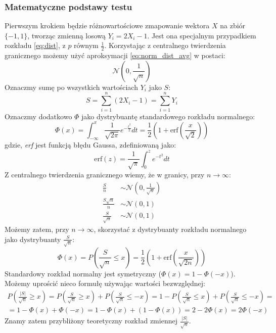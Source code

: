 \subsubsection{Matematyczne podstawy testu}
Pierwszym krokiem będzie różnowartościowe zmapowanie wektora $X$ na zbiór $\{-1, 1\}$, tworząc zmienną losową $Y_i = 2X_i - 1$. Jest ona specjalnym przypadkiem rozkładu \ref{eq:dist}, z $p$ równym $\frac{1}{2}$. Korzystając z centralnego twierdzenia granicznego możemy użyć aproksymacji \ref{eq:norm_dist_avg} w postaci:
\begin{equation}
    \mathcal{N}\left(0, \frac{1}{\sqrt{n}}\right)
\end{equation}
Oznaczmy sumę po wszystkich wartościach $Y_i$ jako $S$:
\begin{equation}
    S =\sum_{i=1}^{n}(2X_i-1) = \sum_{i=1}^{n}Y_i
\end{equation}
Oznaczmy dodatkowo $\Phi$ jako dystrybuantę standardowego rozkładu normalnego:
\begin{equation}
    \Phi(x) = \int_{-\infty}^x\frac{1}{\sqrt{2\pi}}e^{-\frac{t^2}{2}} dt = \frac{1}{2}\left(1+ \textrm{erf}\left(\frac{x}{\sqrt{2}}\right)\right)
\end{equation}
gdzie, \emph{erf} jest funkcją błędu Gaussa, zdefiniowaną jako:
\begin{equation}
    \textrm{erf}(z) = \frac{1}{\sqrt{\pi}}\int_{0}^ze^{-t^2} dt
\end{equation}
Z centralnego twierdzenia granicznego wiemy, że w granicy, przy $n \to \infty$:
\begin{equation}
\begin{split}
    \label{eq:bin_norm}
    \frac{S}{n} &\sim \mathcal{N}\left(0, \frac{1}{\sqrt{n}}\right)\\
    \frac{S\sqrt{n}}{n} &\sim \mathcal{N}\left(0, 1\right)\\
    \frac{S}{\sqrt{n}} &\sim \mathcal{N}\left(0, 1\right)
\end{split}
\end{equation}
Możemy zatem, przy $n \to \infty$, skorzystać z dystrybuanty rozkładu normalnego jako dystrybuanty $\frac{S}{\sqrt{n}}$:
\begin{equation}
    \Phi(x) = P(\frac{S}{\sqrt{n}} \leq x) = \frac{1}{2}\left(1+ \textrm{erf}\left(\frac{x}{\sqrt{2n}}\right)\right)
\end{equation}
Standardowy rozkład normalny jest symetryczny ($\Phi(x) = 1-\Phi(-x)$). Możemy uprościć nieco formułę używając wartości bezwzględnej: 
\begin{equation}
\begin{gathered}
    P\left(\frac{|S|}{\sqrt{n}} \geq x\right) = P\left(\frac{S}{\sqrt{n}} \geq x\right) + P\left(\frac{S}{\sqrt{n}} \leq -x\right) =
    1 - P\left(\frac{S}{\sqrt{n}} \leq x\right) + P\left(\frac{S}{\sqrt{n}} \leq -x\right) =\\=
    1 - \Phi(x) + \Phi(-x) =  1 - \Phi(x) + (1 - \Phi(x))  = 2 - 2\Phi(x) = 2\Phi(-x)
\end{gathered}
\end{equation}
Znamy zatem przybliżony teoretyczny rozkład zmiennej $\frac{|S|}{\sqrt{n}}$.
